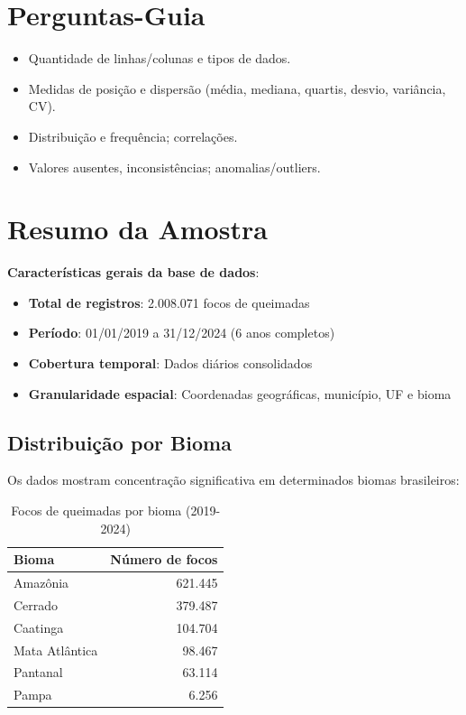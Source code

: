 \documentclass[12pt,a4paper]{report}
\begin{document}
\section{Perguntas-Guia}
\begin{itemize}
  \item Quantidade de linhas/colunas e tipos de dados.
  \item Medidas de posição e dispersão (média, mediana, quartis, desvio, variância, CV).
  \item Distribuição e frequência; correlações.
  \item Valores ausentes, inconsistências; anomalias/outliers.
\end{itemize}

\section{Resumo da Amostra}

\noindent\textbf{Características gerais da base de dados}:

\begin{itemize}
  \item \textbf{Total de registros}: 2.008.071 focos de queimadas
  \item \textbf{Período}: 01/01/2019 a 31/12/2024 (6 anos completos)
  \item \textbf{Cobertura temporal}: Dados diários consolidados
  \item \textbf{Granularidade espacial}: Coordenadas geográficas, município, UF e bioma
\end{itemize}

\subsection{Distribuição por Bioma}

Os dados mostram concentração significativa em determinados biomas brasileiros:

\begin{table}[h]
\centering
\caption{Focos de queimadas por bioma (2019-2024)}
\label{tab:biomas}
\begin{tabular}{lr}
\toprule
\textbf{Bioma} & \textbf{Número de focos} \\
\midrule
Amazônia & 621.445 \\
Cerrado & 379.487 \\
Caatinga & 104.704 \\
Mata Atlântica & 98.467 \\
Pantanal & 63.114 \\
Pampa & 6.256 \\
\bottomrule
\end{tabular}
\end{table}
\end{document}
